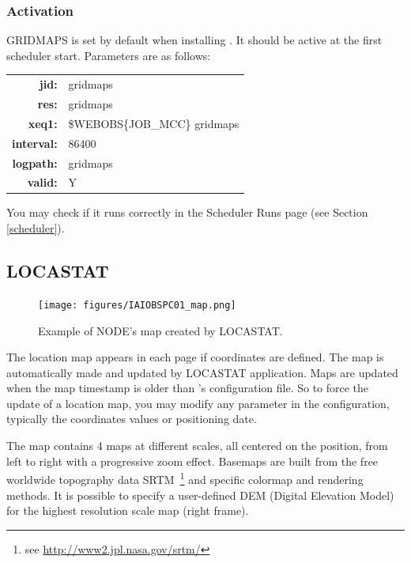 \subsubsection{Activation}

GRIDMAPS is set by default when installing \webobs. It should be active at the first scheduler start. Parameters are as follows:

\begin{tabular}{rl}
\textbf{jid:}      & gridmaps \\
\textbf{res:}      & gridmaps \\
\textbf{xeq1:}     & \$WEBOBS\{JOB\_MCC\} gridmaps \\
\textbf{interval:} & 86400 \\
\textbf{logpath:}  & gridmaps \\
\textbf{valid:}    & Y \\
\end{tabular}

You may check if it runs correctly in the Scheduler Runs page (see Section \ref{scheduler}).


\subsection{LOCASTAT}
\label{locastat}

\begin{figure}
\texttt{[image: figures/IAIOBSPC01\_map.png]}
\caption{Example of NODE's map created by LOCASTAT.}
\end{figure}

The location map appears in each  page if coordinates are defined. The map is automatically made and updated by LOCASTAT application. Maps are updated when the map timestamp is older than 's configuration file. So to force the update of a location map, you may modify any parameter in the  configuration, typically the coordinates values or positioning date. 

The map contains 4 maps at different scales, all centered on the  position, from left to right with a progressive zoom effect. Basemaps are built from the free worldwide topography data SRTM~\footnote{see \url{http://www2.jpl.nasa.gov/srtm/}} and specific colormap and rendering methods. It is possible to specify a user-defined DEM (Digital Elevation Model) for the highest resolution scale map (right frame).


